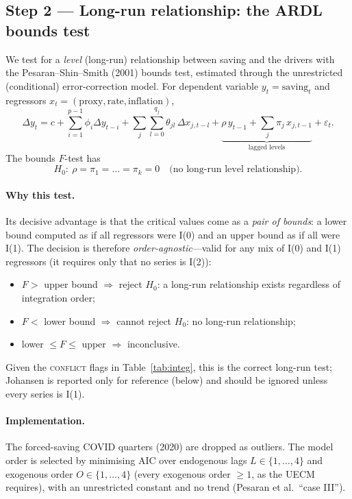 \documentclass[11pt,a4paper]{article}
\begin{document}
\subsection{Step 2 --- Long-run relationship: the ARDL bounds test}
We test for a \emph{level} (long-run) relationship between saving and the drivers
with the Pesaran--Shin--Smith (2001) bounds test, estimated through the
unrestricted (conditional) error-correction model. For dependent variable
$y_t=\text{saving}_t$ and regressors $x_t=(\text{proxy},\text{rate},
\text{inflation})$,
\begin{equation}
  \Delta y_t = c
    + \sum_{i=1}^{p-1}\phi_i \Delta y_{t-i}
    + \sum_{j}\sum_{l=0}^{q_j}\theta_{j l}\,\Delta x_{j,t-l}
    + \underbrace{\rho\,y_{t-1} + \sum_{j}\pi_j\,x_{j,t-1}}_{\text{lagged levels}}
    + \varepsilon_t .
  \label{eq:uecm}
\end{equation}
The bounds $F$-test has
\begin{equation}
  H_0:\ \rho = \pi_1 = \dots = \pi_k = 0
  \quad\text{(no long-run level relationship).}
\end{equation}

\paragraph{Why this test.} Its decisive advantage is that the critical values
come as a \emph{pair of bounds}: a lower bound computed as if all regressors were
I(0) and an upper bound as if all were I(1). The decision is therefore
\emph{order-agnostic}---valid for any mix of I(0) and I(1) regressors (it
requires only that no series is I(2)):
\begin{itemize}
  \item $F >$ upper bound $\Rightarrow$ reject $H_0$: a long-run relationship
  exists regardless of integration order;
  \item $F <$ lower bound $\Rightarrow$ cannot reject $H_0$: no long-run
  relationship;
  \item lower $\le F \le$ upper $\Rightarrow$ inconclusive.
\end{itemize}
Given the \textsc{conflict} flags in Table~\ref{tab:integ}, this is the correct
long-run test; Johansen is reported only for reference (below) and should be
ignored unless every series is I(1).

\paragraph{Implementation.} The forced-saving COVID quarters (2020) are dropped
as outliers. The model order is selected by minimising AIC over endogenous lags
$L\in\{1,\dots,4\}$ and exogenous order $O\in\{1,\dots,4\}$ (every exogenous
order $\ge 1$, as the UECM requires), with an unrestricted constant and no trend
(Pesaran et al.\ ``case III'').
\end{document}

